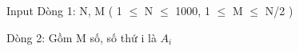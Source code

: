 Input
Dòng 1: N, M ( 1  $\le$  N  $\le$  1000, 1  $\le$  M  $\le$  N/2 )  

   Dòng 2: Gồm M số, số  thứ  i  là   $A_{i}$